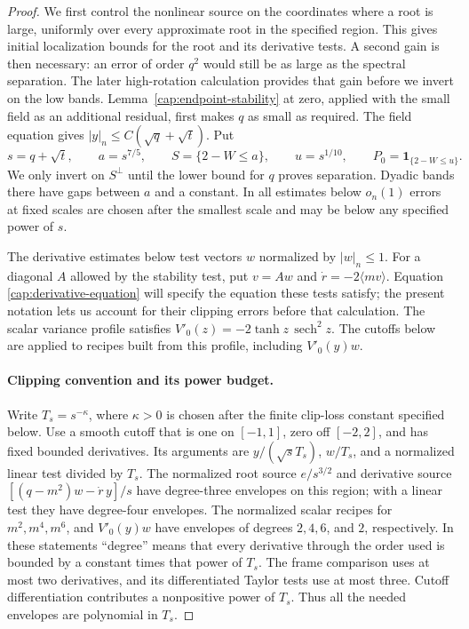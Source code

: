 \begin{proof}
We first control the nonlinear source on the coordinates where a root
is large, uniformly over every approximate root in the specified region.
This gives initial localization bounds for the root and its derivative
tests. A second gain is then necessary: an error of order $q^2$ would still
be as large as the spectral separation. The later high-rotation calculation
provides that gain before we invert on the low bands.
Lemma~\ref{cap:endpoint-stability} at zero, applied with the small field
as an additional residual, first makes $q$ as small as required.
The field equation gives $|y|_n\le C(\sqrt q+\sqrt t)$.
Put
\begin{equation}\label{cap:clipping-scales}
 s=q+\sqrt t,\qquad a=s^{7/5},\qquad
 S=\{2-W\le a\},\qquad u=s^{1/10},\qquad
 P_0=\mathbf1_{\{2-W\le u\}}.
\end{equation}
We only invert on $S^\perp$ until the lower bound for $q$ proves separation.
Dyadic bands there have gaps between $a$ and a constant. In all estimates
below $o_n(1)$ errors at fixed scales are chosen after the smallest scale and
may be below any specified power of $s$.

The derivative estimates below test vectors $w$ normalized by $|w|_n\le1$.
For a diagonal $A$ allowed by the stability test, put $v=Aw$ and
$\dot r=-2\langle mv\rangle$. Equation \eqref{cap:derivative-equation}
will specify the equation these tests satisfy; the present notation lets
us account for their clipping errors before that calculation.
The scalar variance profile satisfies
$V'_0(z)=-2\tanh z\,\operatorname{sech}^2z$. The cutoffs below are applied
to recipes built from this profile, including $V'_0(y)w$.

\paragraph{Clipping convention and its power budget.}
Write $T_s=s^{-\kappa}$, where $\kappa>0$ is chosen after the finite
clip-loss constant specified below.  Use a smooth cutoff that is one on
$[-1,1]$, zero off $[-2,2]$, and has fixed bounded derivatives.  Its
arguments are $y/(\sqrt sT_s)$, $w/T_s$, and a normalized linear test
divided by $T_s$.  The normalized root source
$e/s^{3/2}$ and derivative source
$[(q-m^2)w-\dot r\,y]/s$ have degree-three envelopes on this region;
with a linear test they have degree-four envelopes.  The normalized
scalar recipes for $m^2,m^4,m^6$, and $V'_0(y)w$ have envelopes of
degrees $2,4,6$, and $2$, respectively.  In these statements ``degree''
means that every derivative through the order used is bounded by a
constant times that power of $T_s$.  The frame comparison uses at most
two derivatives, and its differentiated Taylor tests use at most three.
Cutoff differentiation contributes a nonpositive power of $T_s$.
Thus all the needed envelopes are polynomial in $T_s$.


\end{proof}
